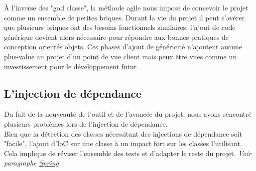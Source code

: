 À l'inverse des "god classe", la méthode agile nous impose de concevoir le projet comme un ensemble de petites briques. Durant la vie du projet il peut s'avérer que plusieurs briques ont des besoins fonctionnels similaires, l'ajout de code générique devient alors nécessaire pour répondre aux bonnes pratiques de conception orientés objets. Ces phases d'ajout de généricité n'ajoutent aucune plus-value au projet d'un point de vue client mais peux être vues comme un investissement pour le développement futur.

{}

\subsection{L'injection de dépendance}

Du fait de la nouveauté de l'outil et de l'avancée du projet, nous avons rencontré plusieurs problèmes lors de l'injection de dépendance.\\
Bien que la détection des classes nécessitant des injections de dépendance soit "facile", l'ajout d'IoC sur une classe à un impact fort sur les classes l'utilisant. Cela implique de réviser l'ensemble des tests et d'adapter le reste du projet. \textit{Voir paragraphe \hyperref[spring]{Spring}}
